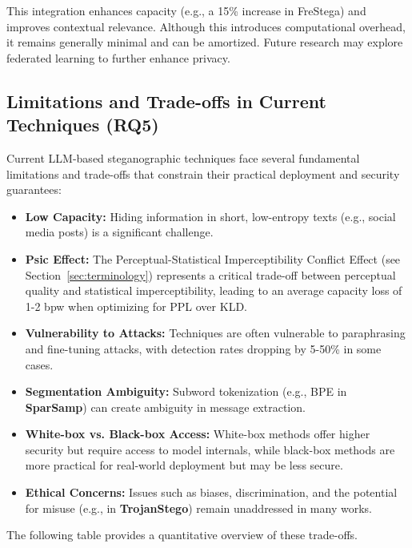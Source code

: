 This integration enhances capacity (e.g., a 15\% increase in FreStega) and improves contextual relevance. Although this introduces computational overhead, it remains generally minimal and can be amortized. Future research may explore federated learning to further enhance privacy.

\subsection{Limitations and Trade-offs in Current Techniques (RQ5)}
\label{subsec:rq5}

Current LLM-based steganographic techniques face several fundamental limitations and trade-offs that constrain their practical deployment and security guarantees:
\begin{itemize}
	\item \textbf{Low Capacity:} Hiding information in short, low-entropy texts (e.g., social media posts) is a significant challenge.
	\item \textbf{Psic Effect:} The Perceptual-Statistical Imperceptibility Conflict Effect (see Section~\ref{sec:terminology}) represents a critical trade-off between perceptual quality and statistical imperceptibility, leading to an average capacity loss of 1-2 bpw when optimizing for PPL over KLD.
	\item \textbf{Vulnerability to Attacks:} Techniques are often vulnerable to paraphrasing and fine-tuning attacks, with detection rates dropping by 5-50\% in some cases.
	\item \textbf{Segmentation Ambiguity:} Subword tokenization (e.g., BPE in \textbf{SparSamp}) can create ambiguity in message extraction.
	\item \textbf{White-box vs. Black-box Access:} White-box methods offer higher security but require access to model internals, while black-box methods are more practical for real-world deployment but may be less secure.
	\item \textbf{Ethical Concerns:} Issues such as biases, discrimination, and the potential for misuse (e.g., in \textbf{TrojanStego}) remain unaddressed in many works.
\end{itemize}

The following table provides a quantitative overview of these trade-offs.

